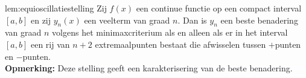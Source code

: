 \begin{lem}[Equioscillatiestelling]{lem:equioscillatiestelling}
    Zij $f(x)$ een continue functie op een compact interval $[a,b]$ en zij $y_n(x)$ een veelterm van graad $n$. Dan is $y_n$ een beste benadering van graad $n$ volgens het minimaxcriterium als en alleen als er in het interval $[a,b]$ een rij van $n+2$ extremaalpunten bestaat die afwisselen tussen $+$punten en $-$punten. \\

    \textbf{Opmerking:} Deze stelling geeft een karakterisering van de beste benadering.
\end{lem}